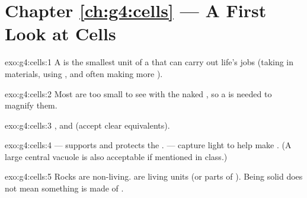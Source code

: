 \section*{Chapter \ref{ch:g4:cells} --- A First Look at Cells}

\begin{solution}{exo:g4:cells:1}
A  is the smallest unit of a  that can carry out life's
jobs (taking in materials, using , and often making more ).
\end{solution}

\begin{solution}{exo:g4:cells:2}
Most  are too small to see with the naked , so a  is
needed to magnify them.
\end{solution}

\begin{solution}{exo:g4:cells:3}
,  and  (accept clear equivalents).
\end{solution}

\begin{solution}{exo:g4:cells:4}
 --- supports and protects the  .  ---
capture light to help make . (A large central vacuole is also
acceptable if mentioned in class.)
\end{solution}

\begin{solution}{exo:g4:cells:5}
Rocks are non-living.  are living units (or parts of ). Being solid does not mean something is made of .
\end{solution}

